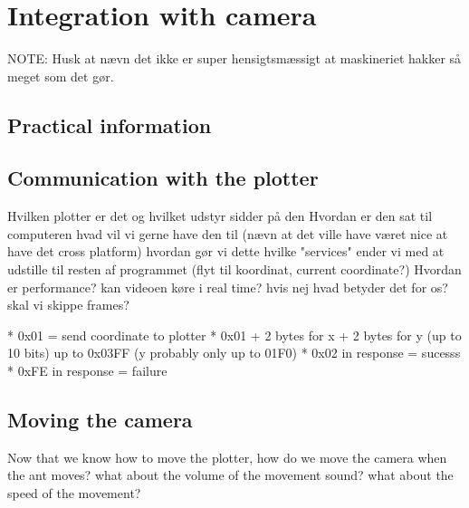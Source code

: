 
\section{Integration with camera}

NOTE: Husk at nævn det ikke er super hensigtsmæssigt at maskineriet hakker så meget som det gør.

\subsection{Practical information}

\subsection{Communication with the plotter}
Hvilken plotter er det og hvilket udstyr sidder på den
Hvordan er den sat til computeren
hvad vil vi gerne have den til (nævn at det ville have været nice at have det cross platform)
hvordan gør vi dette
hvilke "services" ender vi med at udstille til resten af programmet (flyt til koordinat, current coordinate?)
Hvordan er performance? kan videoen køre i real time? hvis nej hvad betyder det for os? skal vi skippe frames?

*   0x01 = send coordinate to plotter
 *   0x01 + 2 bytes for x + 2 bytes for y (up to 10 bits) up to 0x03FF (y probably only up to 01F0)
 *   0x02 in response = sucesss
 *   0xFE in response = failure
 
\subsection{Moving the camera}
Now that we know how to move the plotter, how do we move the camera when the ant moves?
what about the volume of the movement sound?
what about the speed of the movement?
